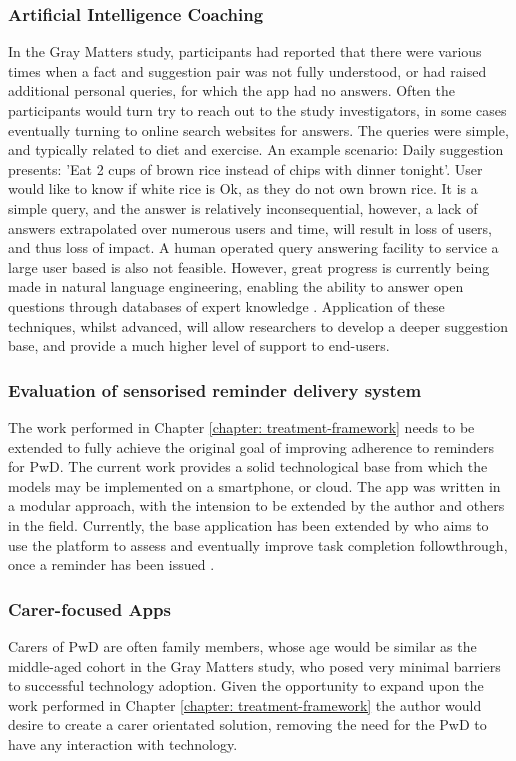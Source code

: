 \subsubsection{Artificial Intelligence Coaching}
In the Gray Matters study, participants had reported that there were various times when a fact and suggestion pair was not fully understood, or had raised additional personal queries, for which the app had no answers. Often the participants would turn try to reach out to the study investigators, in some cases eventually turning to online search websites for answers. The queries were simple, and typically related to diet and exercise. An example scenario:
Daily suggestion presents: 'Eat 2 cups of brown rice instead of chips with dinner tonight'. User would like to know if white rice is Ok, as they do not own brown rice. 
It is a simple query, and the answer is relatively inconsequential, however, a lack of answers extrapolated over numerous users and time, will result in loss of users, and thus loss of impact. A human operated query answering facility to service a large user based is also not feasible. However, great progress is currently being made in natural language engineering, enabling the ability to answer open questions through databases of expert knowledge \cite{HIRSCHMAN2001, Fader2014}. Application of these techniques, whilst advanced, will allow researchers to develop a deeper suggestion base, and provide a much higher level of support to end-users.
 
\subsubsection{Evaluation of sensorised reminder delivery system}
The work performed in Chapter \ref{chapter: treatment-framework} needs to be extended to fully achieve the original goal of improving adherence to reminders for PwD. The current work provides a solid technological base from which the models may be implemented on a smartphone, or cloud. The app was written in a modular approach, with the intension to be extended by the author and others in the field. Currently, the base application has been extended by \citeauthor{Patterson2015} who aims to use the platform to assess and eventually improve task completion followthrough, once a reminder has been issued \cite{Patterson2015}.

\subsubsection{Carer-focused Apps}
Carers of PwD are often family members, whose age would be similar as the middle-aged cohort in the Gray Matters study, who posed very minimal barriers to successful technology adoption. Given the opportunity to expand upon the work performed in Chapter \ref{chapter: treatment-framework} the author would desire to create a carer orientated solution, removing the need for the PwD to have any interaction with technology.

